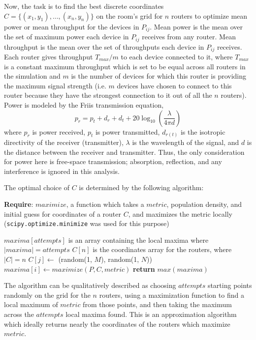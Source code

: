 \documentclass[conference]{IEEEtran}
\begin{document}
Now, the task is to find the best discrete coordinates $C = \{(x_1, y_1), \dots,
(x_n, y_n)\}$ on the room's grid for $n$ routers to optimize mean power or mean
throughput for the devices in $P_{ij}$. Mean power is the mean over the set of
maximum power each device in $P_{ij}$ receives from any router. Mean throughput
is the mean over the set of throughputs each device in $P_{ij}$ receives. 
Each router gives throughput $T_{max} / m$ to each device connected to it, where
$T_{max}$ is a constant maximum throughput which is set to be equal across all
routers in the simulation and $m$ is the number of devices for which this router
is providing the maximum signal strength (i.e. $m$ devices have chosen to
connect to this router because they have the strongest connection to it out of
all the $n$ routers). Power is modeled by the Friis transmission equation,
\[p_r = p_t + d_r + d_t + 20\log_{10}(\frac{\lambda}{4\pi d})\]
where $p_r$ is power received, $p_t$ is power transmitted, $d_{r(t)}$ is the
isotropic directivity of the receiver (transmitter), $\lambda$ is the
wavelength of the signal, and $d$ is the distance between the receiver and
transmitter. Thus, the only consideration for power here is free-space
transmission; absorption, reflection, and any interference is ignored in this
analysis.

The optimal choice of $C$ is determined by the following algorithm:

\begin{algorithm}[H]
  \caption{$placement(P_{ij}, n, metric, attempts)$}
  \textbf{Require}: $maximize$, a function which takes a $metric$, population
  density, and initial guess for coordinates of a router $C$, and maximizes the
  metric locally (\texttt{scipy.optimize.minimize} was used for this purpose)
  \begin{algorithmic}[1]
    \State $maxima[attempts]$ is an array containing the local maxima where
    $|maxima| = attempts$
      \State $C[n]$ is the coordinates array for the routers, where $|C| = n$
        \State $C[j] \gets$ (random(1, $M$), random(1, $N$))
      \EndFor
      \State $maxima[i] \gets maximize(P, C, metric)$
    \EndFor
    \State \textbf{return} $max(maxima)$
  \end{algorithmic}
\end{algorithm}

The algorithm can be qualitatively described as choosing $attempts$ starting points randomly on the grid for the $n$ routers, using a maximization function to find a local maximum of $metric$ from those points, and then taking the maximum across the $attempts$ local maxima found. This is an approximation algorithm which ideally returns nearly the coordinates of the routers which maximize $metric$.
\end{document}
